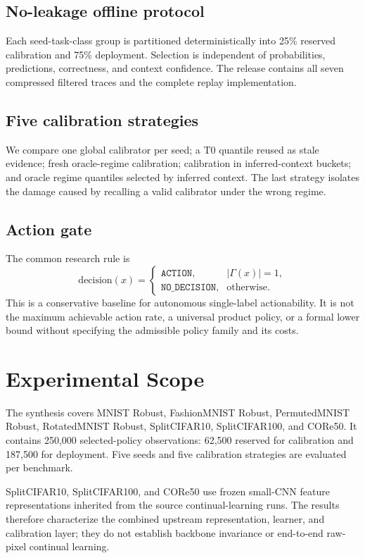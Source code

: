 \documentclass[10pt]{article}
\newcommand{\action}{\texttt{ACTION}}
\newcommand{\nodecision}{\texttt{NO\_DECISION}}
\begin{document}
\subsection{No-leakage offline protocol}
Each seed-task-class group is partitioned deterministically into 25\% reserved calibration and 75\% deployment. Selection is independent of probabilities, predictions, correctness, and context confidence. The release contains all seven compressed filtered traces and the complete replay implementation.

\subsection{Five calibration strategies}
We compare one global calibrator per seed; a T0 quantile reused as stale evidence; fresh oracle-regime calibration; calibration in inferred-context buckets; and oracle regime quantiles selected by inferred context. The last strategy isolates the damage caused by recalling a valid calibrator under the wrong regime.

\subsection{Action gate}
The common research rule is
\begin{equation}
\text{decision}(x)=\begin{cases}\action,&|\Gamma(x)|=1,\\\nodecision,&\text{otherwise}.\end{cases}
\end{equation}
This is a conservative baseline for autonomous single-label actionability. It is not the maximum achievable action rate, a universal product policy, or a formal lower bound without specifying the admissible policy family and its costs.

\clearpage


\section{Experimental Scope}
The synthesis covers MNIST Robust, FashionMNIST Robust, PermutedMNIST Robust, RotatedMNIST Robust, SplitCIFAR10, SplitCIFAR100, and CORe50. It contains 250,000 selected-policy observations: 62,500 reserved for calibration and 187,500 for deployment. Five seeds and five calibration strategies are evaluated per benchmark.

SplitCIFAR10, SplitCIFAR100, and CORe50 use frozen small-CNN feature representations inherited from the source continual-learning runs. The results therefore characterize the combined upstream representation, learner, and calibration layer; they do not establish backbone invariance or end-to-end raw-pixel continual learning.
\end{document}
